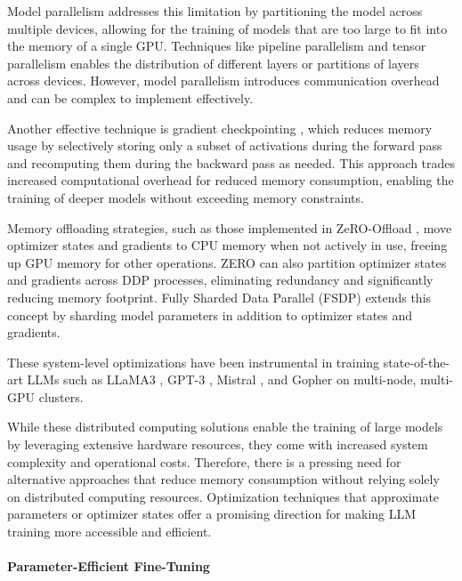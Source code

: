 Model parallelism addresses this limitation by partitioning the model across multiple devices, allowing for the training of models that are too large to fit into the memory of a single GPU. Techniques like pipeline parallelism \citep{huangGPipeEfficientTraining2019} and tensor parallelism \citep{shoeybiMegatronLMTuningScaling2019} enables the distribution of different layers or partitions of layers across devices. However, model parallelism introduces communication overhead and can be complex to implement effectively.

Another effective technique is gradient checkpointing \citep{chenTrainingDeepNets2016}, which reduces memory usage by selectively storing only a subset of activations during the forward pass and recomputing them during the backward pass as needed. This approach trades increased computational overhead for reduced memory consumption, enabling the training of deeper models without exceeding memory constraints.

Memory offloading strategies, such as those implemented in ZeRO-Offload \citep{rajbhandariZeROMemoryOptimizations2020}, move optimizer states and gradients to CPU memory when not actively in use, freeing up GPU memory for other operations. ZERO can also partition optimizer states and gradients across DDP processes, eliminating redundancy and significantly reducing memory footprint. Fully Sharded Data Parallel (FSDP) \citep{zhaoExtendingTorchElasticStateful2020} extends this concept by sharding model parameters in addition to optimizer states and gradients.

These system-level optimizations have been instrumental in training state-of-the-art LLMs such as LLaMA3 \citep{touvronLlamaOpenFoundation2023}, GPT-3 \citep{brownLanguageModelsAre2020}, Mistral \citep{jiangMistralEfficientComposable2023}, and Gopher \citep{raeScalingLanguageModels2021} on multi-node, multi-GPU clusters.

While these distributed computing solutions enable the training of large models by leveraging extensive hardware resources, they come with increased system complexity and operational costs. Therefore, there is a pressing need for alternative approaches that reduce memory consumption without relying solely on distributed computing resources. Optimization techniques that approximate parameters or optimizer states offer a promising direction for making LLM training more accessible and efficient.

\paragraph{Parameter-Efficient Fine-Tuning}

